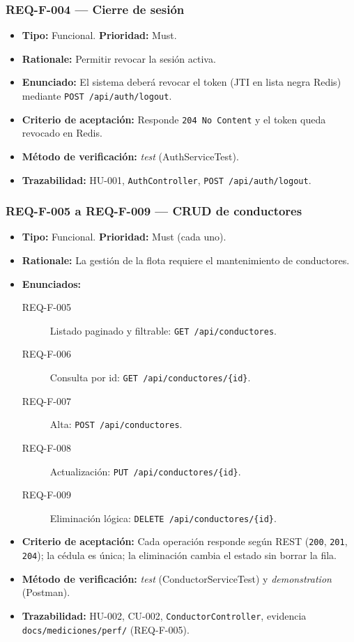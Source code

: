 \documentclass[12pt,a4paper]{article}
\begin{document}
\subsubsection{REQ-F-004 — Cierre de sesión}
\begin{itemize}
  \item \textbf{Tipo:} Funcional. \textbf{Prioridad:} Must.
  \item \textbf{Rationale:} Permitir revocar la sesión activa.
  \item \textbf{Enunciado:} El sistema deberá revocar el token (JTI en lista negra Redis)
  mediante \texttt{POST /api/auth/logout}.
  \item \textbf{Criterio de aceptación:} Responde \texttt{204 No Content} y el token queda
  revocado en Redis.
  \item \textbf{Método de verificación:} \textit{test} (AuthServiceTest).
  \item \textbf{Trazabilidad:} HU-001, \texttt{AuthController}, \texttt{POST /api/auth/logout}.
\end{itemize}

\subsubsection{REQ-F-005 a REQ-F-009 — CRUD de conductores}
\begin{itemize}
  \item \textbf{Tipo:} Funcional. \textbf{Prioridad:} Must (cada uno).
  \item \textbf{Rationale:} La gestión de la flota requiere el mantenimiento de conductores.
  \item \textbf{Enunciados:}
    \begin{description}
      \item[REQ-F-005] Listado paginado y filtrable: \texttt{GET /api/conductores}.
      \item[REQ-F-006] Consulta por id: \texttt{GET /api/conductores/\{id\}}.
      \item[REQ-F-007] Alta: \texttt{POST /api/conductores}.
      \item[REQ-F-008] Actualización: \texttt{PUT /api/conductores/\{id\}}.
      \item[REQ-F-009] Eliminación lógica: \texttt{DELETE /api/conductores/\{id\}}.
    \end{description}
  \item \textbf{Criterio de aceptación:} Cada operación responde según REST (\texttt{200},
  \texttt{201}, \texttt{204}); la cédula es única; la eliminación cambia el estado sin borrar
  la fila.
  \item \textbf{Método de verificación:} \textit{test} (ConductorServiceTest) y
  \textit{demonstration} (Postman).
  \item \textbf{Trazabilidad:} HU-002, CU-002, \texttt{ConductorController},
  evidencia \texttt{docs/mediciones/perf/} (REQ-F-005).
\end{itemize}
\end{document}
